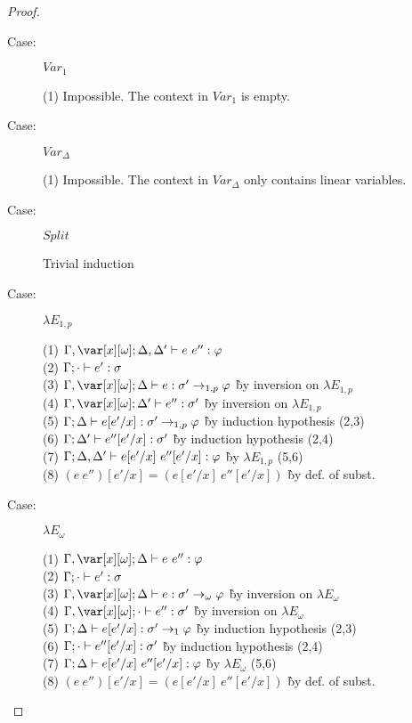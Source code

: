 \begin{proof}
\begin{description}
\item[Case:] $Var_1$
\begin{tabbing}
  (1) Impossible. The context in $Var_1$ is empty.
\end{tabbing}

\item[Case:] $Var_\Delta$
\begin{tabbing}
  (1) Impossible. The context in $Var_\Delta$ only contains linear variables.
\end{tabbing}

\item[Case:] $Split$
\begin{tabbing}
    Trivial induction
\end{tabbing}

\item[Case:] $\lambda E_{1,p}$
\begin{tabbing}
  (1) $\G, \xo; \D,\D' \vdash e~e'' : \vp$\\
  (2) $\Gamma; \cdot \vdash e' : \sigma$\\
  (3) $\G, \xo; \D \vdash e : \s'\to_{1,p}\vp$ \` by inversion on $\lambda E_{1,p}$\\
  (4) $\G, \xo; \D' \vdash e'' : \s'$ \` by inversion on $\lambda E_{1,p}$\\
  (5) $\Gamma; \Delta \vdash e[e'/x] : \sigma'\to_{1,p}\varphi$ \` by induction hypothesis (2,3)\\
  (6) $\Gamma; \Delta' \vdash e''[e'/x] : \sigma'$ \` by induction hypothesis (2,4)\\
  (7) $\Gamma; \Delta, \Delta' \vdash e[e'/x]~e''[e'/x] : \varphi$ \` by $\lambda E_{1,p}$ (5,6)\\
  (8) $(e~e'')[e'/x] = (e[e'/x]~e''[e'/x])$ \` by def. of subst.\\
\end{tabbing}

\item[Case:] $\lambda E_\omega$
\begin{tabbing}
    (1) $\G, \xo; \D \vdash e~e'' : \vp$\\
    (2) $\Gamma; \cdot \vdash e' : \sigma$\\
    (3) $\G, \xo; \D \vdash e : \s'\to_\omega\vp$ \` by inversion on $\lambda E_\omega$\\
    (4) $\G, \xo; \cdot \vdash e'' : \s'$ \` by inversion on $\lambda E_\omega$\\
    (5) $\Gamma; \Delta \vdash e[e'/x] : \sigma'\to_1\varphi$ \` by induction hypothesis (2,3)\\
    (6) $\Gamma; \cdot \vdash e''[e'/x] : \sigma'$ \` by induction hypothesis (2,4)\\
    (7) $\Gamma; \Delta \vdash e[e'/x]~e''[e'/x] : \varphi$ \` by $\lambda E_\omega$ (5,6)\\
    (8) $(e~e'')[e'/x] = (e[e'/x]~e''[e'/x])$ \` by def. of subst.\\
\end{tabbing}


\end{description}
\end{proof}
